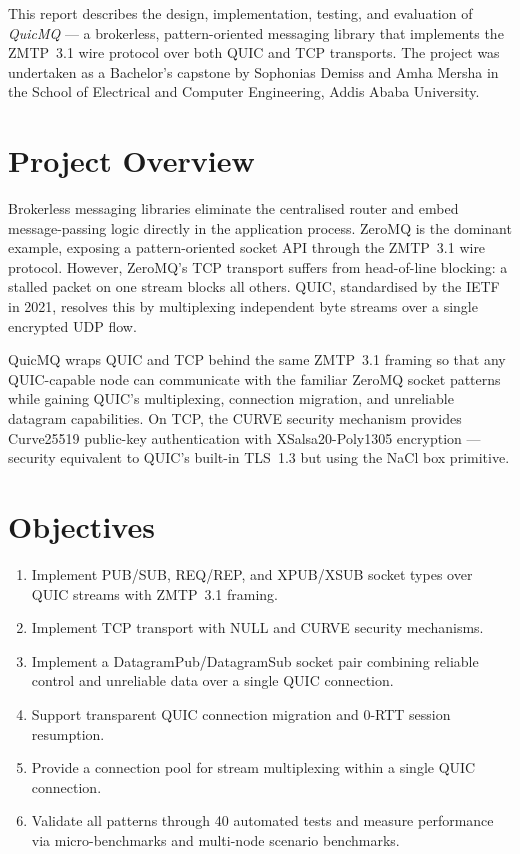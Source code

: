 \documentclass[12pt, a4paper, oneside]{report}
\begin{document}
This report describes the design, implementation, testing, and evaluation of \textit{QuicMQ} — a brokerless, pattern-oriented messaging library that implements the ZMTP~3.1 wire protocol over both QUIC and TCP transports. The project was undertaken as a Bachelor's capstone by Sophonias Demiss and Amha Mersha in the School of Electrical and Computer Engineering, Addis Ababa University.

\section{Project Overview}
\label{sec:exec-overview}

Brokerless messaging libraries eliminate the centralised router and embed message-passing logic directly in the application process. ZeroMQ is the dominant example, exposing a pattern-oriented socket API through the ZMTP~3.1 wire protocol. However, ZeroMQ's TCP transport suffers from head-of-line blocking: a stalled packet on one stream blocks all others. QUIC, standardised by the IETF in 2021, resolves this by multiplexing independent byte streams over a single encrypted UDP flow.

QuicMQ wraps QUIC and TCP behind the same ZMTP~3.1 framing so that any QUIC-capable node can communicate with the familiar ZeroMQ socket patterns while gaining QUIC's multiplexing, connection migration, and unreliable datagram capabilities. On TCP, the CURVE security mechanism provides Curve25519 public-key authentication with XSalsa20-Poly1305 encryption — security equivalent to QUIC's built-in TLS~1.3 but using the NaCl box primitive.

\section{Objectives}
\label{sec:exec-objectives}

\begin{enumerate}
  \item Implement PUB/SUB, REQ/REP, and XPUB/XSUB socket types over QUIC streams with ZMTP~3.1 framing.
  \item Implement TCP transport with NULL and CURVE security mechanisms.
  \item Implement a DatagramPub/DatagramSub socket pair combining reliable control and unreliable data over a single QUIC connection.
  \item Support transparent QUIC connection migration and 0-RTT session resumption.
  \item Provide a connection pool for stream multiplexing within a single QUIC connection.
  \item Validate all patterns through 40 automated tests and measure performance via micro-benchmarks and multi-node scenario benchmarks.
\end{enumerate}
\end{document}
